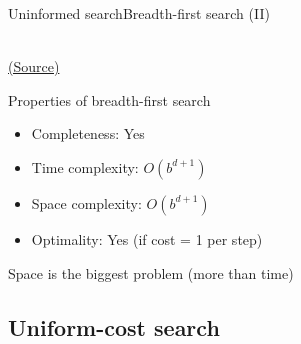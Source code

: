 \documentclass[10pt,compress]{beamer} %
\begin{document}
\begin{frame}{Uninformed search}{Breadth-first search (II)}
      \begin{center}
          \setlength{\fboxrule}{0pt}
           \\
          \tiny{\href{http://aima.cs.berkeley.edu/index.html}{(Source)}}
      \end{center}

      \bigskip

      Properties of breadth-first search
      \begin{itemize}
        \item Completeness: Yes
        \item Time complexity: $O(b^{d+1})$
        \item Space complexity: $O(b^{d+1})$
        \item Optimality: Yes (if cost = 1 per step)
      \end{itemize}
      Space is the biggest problem (more than time)
\end{frame}

\subsection{Uniform-cost search}
\end{document}
